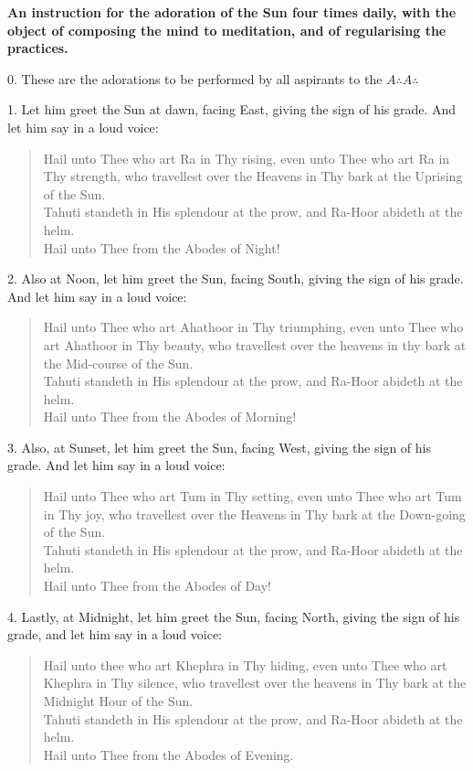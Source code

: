 
\textbf{An instruction for the adoration of the Sun four times daily, with the object of composing the mind to meditation, and of regularising the practices.}

0. These are the adorations to be performed by all aspirants to the $A\therefore{}A\therefore$

1. Let him greet the Sun at dawn, facing East, giving the sign of his grade. And let him say in a loud voice:

\begin{verse}
Hail unto Thee who art Ra in Thy rising, even unto Thee who art Ra in Thy strength, who travellest over the Heavens in Thy bark at the Uprising of the Sun.  \\
Tahuti standeth in His splendour at the prow, and Ra-Hoor abideth at the helm. \\
Hail unto Thee from the Abodes of Night!
\end{verse}

2. Also at Noon, let him greet the Sun, facing South, giving the sign of his grade. And let him say in a loud voice:

\begin{verse}
Hail unto Thee who art Ahathoor in Thy triumphing, even unto Thee who art Ahathoor in Thy beauty, who travellest over the heavens in thy bark at the Mid-course of the Sun. \\
Tahuti standeth in His splendour at the prow, and Ra-Hoor abideth at the helm. \\
Hail unto Thee from the Abodes of Morning!
\end{verse}

3. Also, at Sunset, let him greet the Sun, facing West, giving the sign of his grade. And let him say in a loud voice:
\begin{verse}
Hail unto Thee who art Tum in Thy setting, even unto Thee who art Tum in Thy joy, who travellest over the Heavens in Thy bark at the Down-going of the Sun. \\
Tahuti standeth in His splendour at the prow, and Ra-Hoor abideth at the helm. \\
Hail unto Thee from the Abodes of Day!
\end{verse}

4. Lastly, at Midnight, let him greet the Sun, facing North, giving the sign of his grade, and let him say in a loud voice:
\begin{verse}
Hail unto thee who art Khephra in Thy hiding, even unto Thee who art Khephra in Thy silence, who travellest over the heavens in Thy bark at the Midnight Hour of the Sun. \\
Tahuti standeth in His splendour at the prow, and Ra-Hoor abideth at the helm. \\
Hail unto Thee from the Abodes of Evening.
\end{verse}

